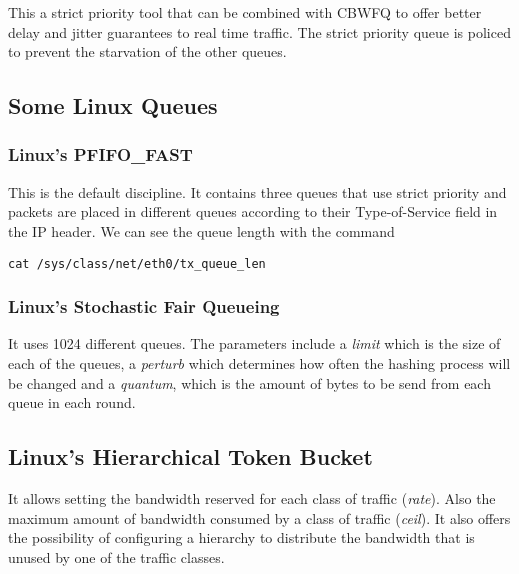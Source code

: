 This a strict priority tool that can be combined with CBWFQ to offer better delay and jitter guarantees to real time traffic.
The strict priority queue is policed to prevent the starvation of the other queues.

\subsection{Some Linux Queues}

\subsubsection{Linux's PFIFO\_FAST}

This is the default discipline.
It contains three queues that use strict priority and packets are placed in different queues according to their Type-of-Service field in the IP header.
We can see the queue length with the command 

\texttt{cat /sys/class/net/eth0/tx\_queue\_len}

\subsubsection{Linux's Stochastic Fair Queueing}

It uses 1024 different queues.
The parameters include a \emph{limit} which is the size of each of the queues, a \emph{perturb} which determines how often the hashing process will be changed and a \emph{quantum}, which is the amount of bytes to be send from each queue in each round.

\subsection{Linux's Hierarchical Token Bucket}

It allows setting the bandwidth reserved for each class of traffic (\emph{rate}).
Also the maximum amount of bandwidth consumed by a class of traffic (\emph{ceil}).
It also offers the possibility of configuring a hierarchy to distribute the bandwidth that is unused by one of the traffic classes.
